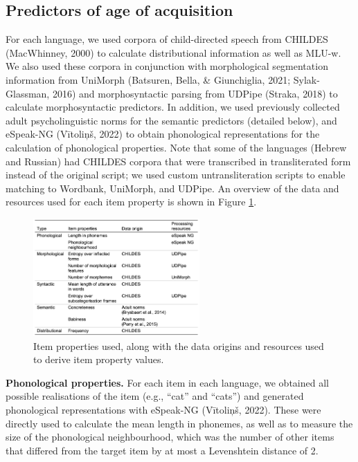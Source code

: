 \documentclass[10pt, letterpaper]{article}
\newenvironment{CodeChunk}{}{}
\begin{document}
\hypertarget{predictors-of-age-of-acquisition}{%
\subsection{Predictors of age of
acquisition}\label{predictors-of-age-of-acquisition}}

For each language, we used corpora of child-directed speech from CHILDES
(MacWhinney, 2000) to calculate distributional information as well as
MLU-w. We also used these corpora in conjunction with morphological
segmentation information from UniMorph (Batsuren, Bella, \& Giunchiglia,
2021; Sylak-Glassman, 2016) and morphosyntactic parsing from UDPipe
(Straka, 2018) to calculate morphosyntactic predictors. In addition, we
used previously collected adult psycholinguistic norms for the semantic
predictors (detailed below), and eSpeak-NG (Vītoliņš, 2022) to obtain
phonological representations for the calculation of phonological
properties. Note that some of the languages (Hebrew and Russian) had
CHILDES corpora that were transcribed in transliterated form instead of
the original script; we used custom untransliteration scripts to enable
matching to Wordbank, UniMorph, and UDPipe. An overview of the data and
resources used for each item property is shown in Figure
\ref{fig:sources}.

\begin{CodeChunk}
\begin{figure}[ht]

{\centering \includegraphics[width=240px]{figs/sources} 

}

\caption[Item properties used, along with the data origins and resources used to derive item property values]{Item properties used, along with the data origins and resources used to derive item property values.}\label{fig:sources}
\end{figure}
\end{CodeChunk}

\textbf{Phonological properties.} For each item in each language, we
obtained all possible realisations of the item (e.g., ``cat'' and
``cats'') and generated phonological representations with eSpeak-NG
(Vītoliņš, 2022). These were directly used to calculate the mean length
in phonemes, as well as to measure the size of the phonological
neighbourhood, which was the number of other items that differed from
the target item by at most a Levenshtein distance of 2.
\end{document}
